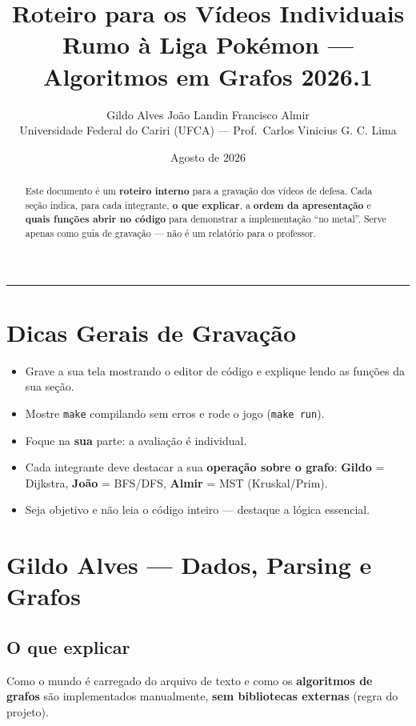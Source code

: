 \documentclass[11pt,a4paper]{article}
\title{\textbf{Roteiro para os Vídeos Individuais}\\[0.5em]
\large Rumo à Liga Pokémon --- Algoritmos em Grafos 2026.1}
\author{Gildo Alves\,\textbullet\,João Landin\,\textbullet\,Francisco Almir\\[0.3em]
\small Universidade Federal do Cariri (UFCA) --- Prof.\ Carlos Vinicius G. C. Lima}
\date{Agosto de 2026}
\begin{document}
\maketitle
\vspace{-1.5em}
\begin{center}
\rule{\textwidth}{0.4pt}
\end{center}

\begin{abstract}
\noindent Este documento é um \textbf{roteiro interno} para a gravação dos vídeos de defesa.
Cada seção indica, para cada integrante, \textbf{o que explicar}, a \textbf{ordem da apresentação}
e \textbf{quais funções abrir no código} para demonstrar a implementação ``no metal''.
Serve apenas como guia de gravação --- não é um relatório para o professor.
\end{abstract}

\section{Dicas Gerais de Gravação}

\begin{itemize}[leftmargin=2em,itemsep=2pt]
  \item Grave a sua tela mostrando o editor de código e explique lendo as funções da sua seção.
  \item Mostre \texttt{make} compilando sem erros e rode o jogo (\texttt{make run}).
  \item Foque na \textbf{sua} parte: a avaliação é individual.
  \item Cada integrante deve destacar a sua \textbf{operação sobre o grafo}: \textbf{Gildo} = Dijkstra, \textbf{João} = BFS/DFS, \textbf{Almir} = MST (Kruskal/Prim).
  \item Seja objetivo e não leia o código inteiro --- destaque a lógica essencial.
\end{itemize}

\section{Gildo Alves --- Dados, Parsing e Grafos}

\subsection{O que explicar}
Como o mundo é carregado do arquivo de texto e como os \textbf{algoritmos de grafos}
são implementados manualmente, \textbf{sem bibliotecas externas} (regra do projeto).
\end{document}
